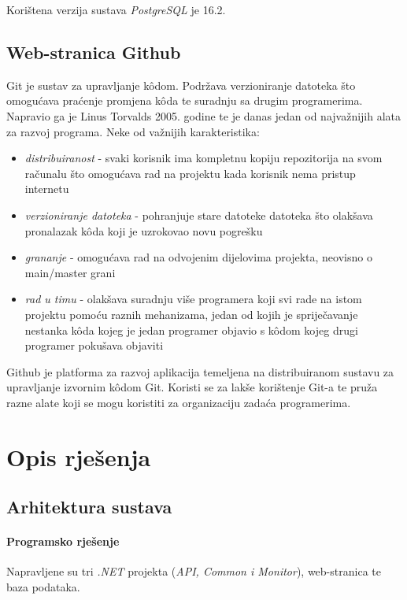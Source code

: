 \documentclass[zavrsnirad]{fer}
\begin{document}
Korištena verzija sustava \textit{PostgreSQL} je 16.2.

\section{Web-stranica Github}
Git je sustav za upravljanje kôdom. Podržava verzioniranje datoteka što omogućava praćenje promjena kôda te suradnju sa drugim programerima. Napravio ga je Linus Torvalds 2005. godine te je danas jedan od najvažnijih alata za razvoj programa. Neke od važnijih karakteristika:
\begin{itemize}
	\item \textit{distribuiranost} - svaki korisnik ima kompletnu kopiju repozitorija na svom računalu što omogućava rad na projektu kada korisnik nema pristup internetu
	\item \textit{verzioniranje datoteka} - pohranjuje stare datoteke datoteka što olakšava pronalazak kôda koji je uzrokovao novu pogrešku
	\item \textit{grananje} - omogućava rad na odvojenim dijelovima projekta, neovisno o main/master grani
	\item \textit{rad u timu} - olakšava suradnju više programera koji svi rade na istom projektu pomoću raznih mehanizama, jedan od kojih je spriječavanje nestanka kôda kojeg je jedan programer objavio s kôdom kojeg drugi programer pokušava objaviti
\end{itemize}

Github je platforma za razvoj aplikacija temeljena na distribuiranom sustavu za upravljanje izvornim kôdom Git. Koristi se za lakše korištenje Git-a te pruža razne alate koji se mogu koristiti za organizaciju zadaća programerima.


\chapter{Opis rješenja}
\label{pog:opis_rjesenja}

\section{Arhitektura sustava}
\subsubsection{Programsko rješenje}
Napravljene su tri \textit{.NET} projekta (\textit{API, Common i Monitor}), web-stranica te baza podataka.
\end{document}
